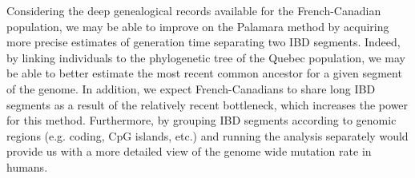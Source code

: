 \documentclass[
11pt, %
oneside, %
english, %
doublespacing, %
headsepline, %
chapterinoneline, %
]{MastersDoctoralThesis} %
\begin{document}
Considering the deep genealogical records available for the French-Canadian population, we may be able to improve on the Palamara method by acquiring more precise estimates of generation time separating two IBD segments.
Indeed, by linking individuals to the phylogenetic tree of the Quebec population, we may be able to better estimate the most recent common ancestor for a given segment of the genome.
In addition, we expect French-Canadians to share long IBD segments as a result of the relatively recent bottleneck, which increases the power for this method.
Furthermore, by grouping IBD segments according to genomic regions (e.g. coding, CpG islands, etc.) and running the analysis separately would provide us with a more detailed view of the genome wide mutation rate in humans.

\restoregeometry 
\clearpage
\appendix %
\end{document}
